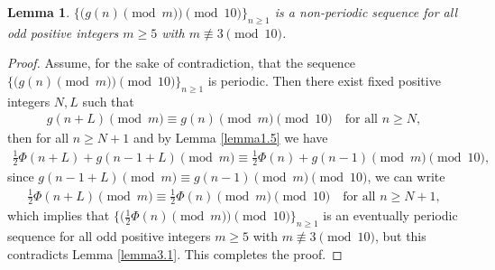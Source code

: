 \documentclass[12pt,reqno]{amsart}
\newtheorem{lemma} [theorem]{Lemma}
\begin{document}
\begin{lemma}\label{lemma3.2}
$\{\big(g(n) \pmod{m}\big)\pmod{10}\}_{n\geq 1}$ is a non-periodic sequence for all odd positive integers $m\geq 5$ with $m\not\equiv 3 \pmod{10}$.
\end{lemma}
\begin{proof}
Assume, for the sake of contradiction, that the sequence $\{\big(g(n) \pmod{m}\big)\pmod{10}\}_{n\geq 1}$ is periodic. Then there exist fixed positive integers $N,L$ such that
\begin{align}\label{14}
g(n+L) \pmod{m}\equiv g(n) \pmod{m} \pmod{10}\quad \text{for all~}n\geq N,    
\end{align}
then for all $n\geq N+1$ and by Lemma \ref{lemma1.5} we have
\begin{align}\label{15}
\frac{1}{2}\Phi(n+L)+g(n-1+L) \pmod{m}\equiv \frac{1}{2}\Phi(n)+g(n-1) \pmod{m} \pmod{10},    
\end{align}
since $g(n-1+L) \pmod{m}\equiv g(n-1) \pmod{m} \pmod{10}$, we can write
\begin{align}\label{16}
\frac{1}{2}\Phi(n+L)\pmod{m}\equiv \frac{1}{2}\Phi(n)\pmod{m} \pmod{10}\quad \text{for all~}n\geq N+1,    
\end{align}
which implies that $\{\big(\frac{1}{2}\Phi(n) \pmod{m}\big)\pmod{10}\}_{n\geq 1}$ is an eventually periodic sequence for all odd positive integers $m\geq 5$ with $m\not\equiv 3 \pmod{10}$, but this contradicts Lemma \ref{lemma3.1}. This completes the proof.
\end{proof}
\end{document}
